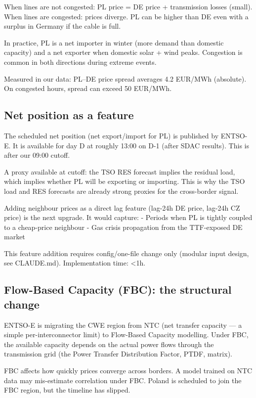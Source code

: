When lines are not congested: PL price = DE price + transmission losses (small).
When lines are congested: prices diverge. PL can be higher than DE
even with a surplus in Germany if the cable is full.

In practice, PL is a net importer in winter (more demand than domestic capacity)
and a net exporter when domestic solar + wind peaks.
Congestion is common in both directions during extreme events.

Measured in our data: PL--DE price spread averages 4.2 EUR/MWh (absolute).
On congested hours, spread can exceed 50 EUR/MWh.

\subsection{Net position as a feature}

The scheduled net position (net export/import for PL) is published by ENTSO-E.
It is available for day D at roughly 13:00 on D-1 (after SDAC results).
This is after our 09:00 cutoff.

A proxy available at cutoff: the TSO RES forecast implies the residual
load, which implies whether PL will be exporting or importing.
This is why the TSO load and RES forecasts are already strong proxies
for the cross-border signal.

Adding neighbour prices as a direct lag feature (lag-24h DE price,
lag-24h CZ price) is the next upgrade. It would capture:
- Periods when PL is tightly coupled to a cheap-price neighbour
- Gas crisis propagation from the TTF-exposed DE market

This feature addition requires config/one-file change only
(modular input design, see CLAUDE.md). Implementation time: \textless 1h.

\subsection{Flow-Based Capacity (FBC): the structural change}

ENTSO-E is migrating the CWE region from NTC (net transfer capacity —
a simple per-interconnector limit) to Flow-Based Capacity modelling.
Under FBC, the available capacity depends on the actual power flows
through the transmission grid (the Power Transfer Distribution Factor,
PTDF, matrix).

FBC affects how quickly prices converge across borders. A model trained
on NTC data may mis-estimate correlation under FBC.
Poland is scheduled to join the FBC region, but the timeline has slipped.


